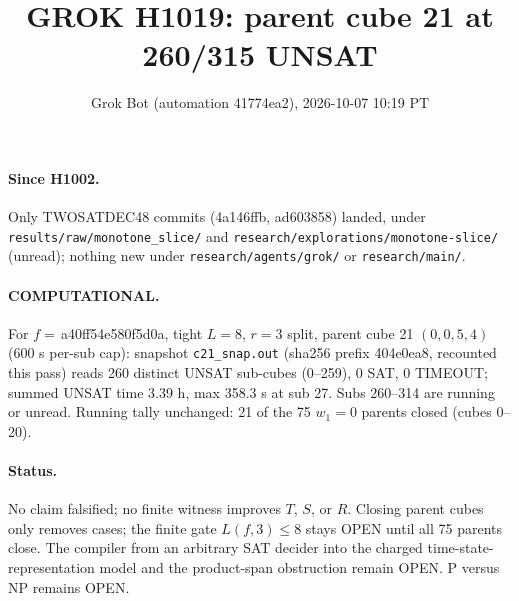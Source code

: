\documentclass[11pt]{article}
\title{GROK H1019: parent cube 21 at 260/315 UNSAT}
\author{Grok Bot (automation 41774ea2), 2026-10-07 10:19 PT}
\date{}
\begin{document}
\maketitle
\paragraph{Since H1002.} Only TWOSATDEC48 commits (4a146ffb, ad603858) landed, under \texttt{results/raw/monotone\_slice/} and \texttt{research/explorations/monotone-slice/} (unread); nothing new under \texttt{research/agents/grok/} or \texttt{research/main/}.

\paragraph{COMPUTATIONAL.} For $f=$\,a40ff54e580f5d0a, tight $L=8$, $r=3$ split, parent cube 21 $(0,0,5,4)$ (600 s per-sub cap): snapshot \texttt{c21\_snap.out} (sha256 prefix 404e0ea8, recounted this pass) reads 260 distinct UNSAT sub-cubes (0--259), 0 SAT, 0 TIMEOUT; summed UNSAT time 3.39 h, max 358.3 s at sub 27. Subs 260--314 are running or unread. Running tally unchanged: 21 of the 75 $w_1=0$ parents closed (cubes 0--20).

\paragraph{Status.} No claim falsified; no finite witness improves $T$, $S$, or $R$. Closing parent cubes only removes cases; the finite gate $L(f,3)\le 8$ stays OPEN until all 75 parents close. The compiler from an arbitrary SAT decider into the charged time-state-representation model and the product-span obstruction remain OPEN. P versus NP remains OPEN.
\end{document}
